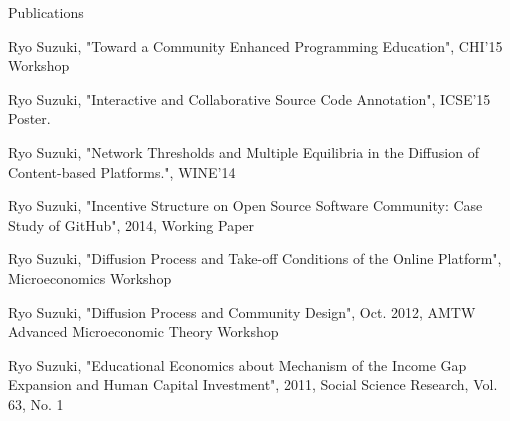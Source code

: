 \documentclass{resume} %
\begin{document}
\begin{rSection}{Publications}

Ryo Suzuki, "Toward a Community Enhanced Programming Education", CHI'15 Workshop

Ryo Suzuki, "Interactive and Collaborative Source Code Annotation", ICSE'15 Poster.

Ryo Suzuki, "Network Thresholds and Multiple Equilibria in the Diffusion of Content-based Platforms.", WINE'14

Ryo Suzuki, "Incentive Structure on Open Source Software Community: Case Study of GitHub", 2014, Working Paper

Ryo Suzuki, "Diffusion Process and Take-off Conditions of the Online Platform", Microeconomics Workshop

Ryo Suzuki, "Diffusion Process and Community Design", Oct. 2012, AMTW Advanced Microeconomic Theory Workshop

Ryo Suzuki, "Educational Economics about Mechanism of the Income Gap Expansion and Human Capital Investment", 2011, Social Science Research, Vol. 63, No. 1
\\
\end{rSection}
\end{document}
